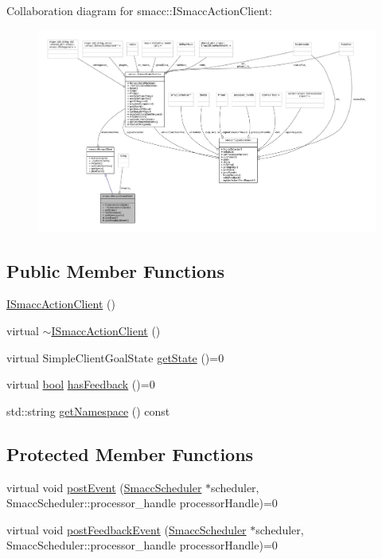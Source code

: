 Collaboration diagram for smacc\+:\+:I\+Smacc\+Action\+Client\+:
\nopagebreak
\begin{figure}[H]
\begin{center}
\leavevmode
\includegraphics[width=350pt]{classsmacc_1_1ISmaccActionClient__coll__graph}
\end{center}
\end{figure}
\subsection*{Public Member Functions}
\begin{DoxyCompactItemize}
\item 
\hyperlink{classsmacc_1_1ISmaccActionClient_a42e3f1a869fd7ec6805437989ba58abc}{I\+Smacc\+Action\+Client} ()
\item 
virtual \hyperlink{classsmacc_1_1ISmaccActionClient_addfb7671a467fc52cb8ee49e23d48fec}{$\sim$\+I\+Smacc\+Action\+Client} ()
\item 
virtual Simple\+Client\+Goal\+State \hyperlink{classsmacc_1_1ISmaccActionClient_a272349b93828674d57fb48070f4edebf}{get\+State} ()=0
\item 
virtual \hyperlink{classbool}{bool} \hyperlink{classsmacc_1_1ISmaccActionClient_aeb19cbd28597071617f8324954fa7c40}{has\+Feedback} ()=0
\item 
std\+::string \hyperlink{classsmacc_1_1ISmaccActionClient_ac9355b793956473a52879a9638601f02}{get\+Namespace} () const 
\end{DoxyCompactItemize}
\subsection*{Protected Member Functions}
\begin{DoxyCompactItemize}
\item 
virtual void \hyperlink{classsmacc_1_1ISmaccActionClient_a5d7d401ab20e1354348848f427a603ed}{post\+Event} (\hyperlink{common_8h_a13d01c0cecec33c3093445edab0a7eb4}{Smacc\+Scheduler} $\ast$scheduler, Smacc\+Scheduler\+::processor\+\_\+handle processor\+Handle)=0
\item 
virtual void \hyperlink{classsmacc_1_1ISmaccActionClient_af3b9ad387577ce3edcf4f0a93cf87599}{post\+Feedback\+Event} (\hyperlink{common_8h_a13d01c0cecec33c3093445edab0a7eb4}{Smacc\+Scheduler} $\ast$scheduler, Smacc\+Scheduler\+::processor\+\_\+handle processor\+Handle)=0
\end{DoxyCompactItemize}
